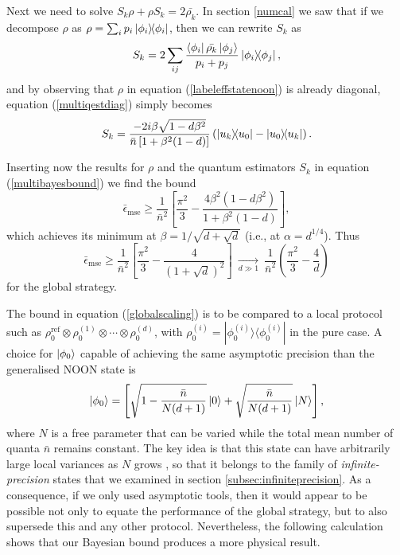 Next we need to solve $S_k \rho + \rho S_k = 2\bar{\rho_k}$. In section \ref{numcal} we saw that if we decompose $\rho$ as $\rho = \sum_i p_i \ketbra{\phi_i}$, then we can rewrite $S_k$ as
\begin{equation}
S_k = 2 \sum_{i j} \frac{\bra{\phi_i}\bar{\rho_k}\ket{\phi_j}}{p_i + p_j}\ketbra{\phi_i}{\phi_j},
\label{multiqestdiag}
\end{equation}
and by observing that $\rho$ in equation (\ref{labeleffstatenoon}) is already diagonal, equation (\ref{multiqestdiag}) simply becomes
\begin{equation}
S_k =  \frac{- 2i\beta \sqrt{1-d\beta^2}}{\bar{n}\left[1+\beta^2(1-d)\right]} \left(\ketbra{u_k}{u_0} - \ketbra{u_0}{u_k}\right).
\end{equation}

Inserting now the results for $\rho$ and the quantum estimators $S_k$ in equation (\ref{multibayesbound}) we find the bound
\begin{equation}
\bar{\epsilon}_{\mathrm{mse}} \geqslant \frac{1}{\bar{n}^2} \left[\frac{\pi^2}{3} - \frac{4\beta^2 (1-d\beta^2)}{1+\beta^2(1-d)} \right],
\end{equation}
which achieves its minimum at $\beta = 1/\sqrt{d+\sqrt{d}}$ (i.e., at $\alpha = d^{1/4}$). Thus
\begin{equation}
\bar{\epsilon}_{\mathrm{mse}} \geqslant \frac{1}{\bar{n}^2} \left[\frac{\pi^2}{3} - \frac{4}{(1+\sqrt{d})^2} \right] ~\underset{d\gg 1}{\longrightarrow}~ \frac{1}{\bar{n}^2}\left(\frac{\pi^2}{3} - \frac{4}{d}\right)
\label{globalscaling}
\end{equation}
for the global strategy. 

The bound in equation (\ref{globalscaling}) is to be compared to a local protocol such as $\rho_0^{\mathrm{ref}}\otimes \rho_0^{(1)}\otimes \cdots \otimes \rho_0^{(d)}$, with $\rho_0^{(i)} = |\phi_0^{(i)}\rangle \langle \phi_0^{(i)}|$ in the pure case. A choice for $\ket{\phi_0}$ capable of achieving the same asymptotic precision than the generalised NOON state is \cite{knott2016local}
\begin{equation}
\ket{\phi_0} = \left[\sqrt{1- \frac{\bar{n}}{N(d+1)}}\ket{0}+\sqrt{\frac{\bar{n}}{N(d+1)}}\ket{N}\right],
\label{localstrategy}
\end{equation}
where $N$ is a free parameter that can be varied while the total mean number of quanta $\bar{n}$ remains constant. The key idea is that this state can have arbitrarily large local variances as $N$ grows \cite{rivas2012, knott2016local, tsang2012}, so that it belongs to the family of \emph{infinite-precision} states that we examined in section \ref{subsec:infiniteprecision}. As a consequence, if we only used asymptotic tools, then it would appear to be possible not only to equate the performance of the global strategy, but to also supersede this and any other protocol. Nevertheless, the following calculation shows that our Bayesian bound produces a more physical result. 

